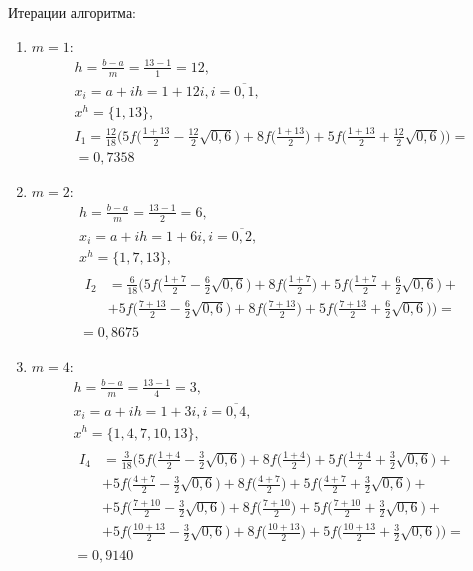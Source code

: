 \documentclass[a4paper, 12pt]{article}
\begin{document}
	Итерации алгоритма:
	\begin{enumerate}
		\item $m=1$:
		\begin{equation*}
			\begin{gathered}
				h=\frac{b-a}{m}=\frac{13-1}{1}=12,\\
				x_i=a+ih=1+12i, i=\overline{0,1},\\
				x^h=\{1,13\},\\
				I_1=\frac{12}{18}\bigg(5f\bigg(\frac{1+13}{2}-\frac{12}{2}\sqrt{0,6}\bigg)+8f\bigg(\frac{1+13}{2}\bigg)+5f\bigg(\frac{1+13}{2}+\frac{12}{2}\sqrt{0,6}\bigg)\bigg)=\\=0,7358
			\end{gathered}
		\end{equation*}
		\item $m=2$:
		\begin{equation*}
			\begin{gathered}
				h=\frac{b-a}{m}=\frac{13-1}{2}=6,\\
				x_i=a+ih=1+6i, i=\overline{0,2},\\
				x^h=\{1,7,13\},\\
				\begin{aligned}
					I_2&=\frac{6}{18}\bigg(5f\bigg(\frac{1+7}{2}-\frac{6}{2}\sqrt{0,6}\bigg)+8f\bigg(\frac{1+7}{2}\bigg)+5f\bigg(\frac{1+7}{2}+\frac{6}{2}\sqrt{0,6}\bigg)+\\&+5f\bigg(\frac{7+13}{2}-\frac{6}{2}\sqrt{0,6}\bigg)+8f\bigg(\frac{7+13}{2}\bigg)+5f\bigg(\frac{7+13}{2}+\frac{6}{2}\sqrt{0,6}\bigg)\bigg)=
				\end{aligned}\\
				=0,8675
			\end{gathered}
		\end{equation*}
		\item $m=4$:
		\begin{equation*}
			\begin{gathered}
				h=\frac{b-a}{m}=\frac{13-1}{4}=3,\\
				x_i=a+ih=1+3i, i=\overline{0,4},\\
				x^h=\{1,4,7,10,13\},\\
				\begin{aligned}
					I_4&=\frac{3}{18}\bigg(5f\bigg(\frac{1+4}{2}-\frac{3}{2}\sqrt{0,6}\bigg)+8f\bigg(\frac{1+4}{2}\bigg)+5f\bigg(\frac{1+4}{2}+\frac{3}{2}\sqrt{0,6}\bigg)+\\&+5f\bigg(\frac{4+7}{2}-\frac{3}{2}\sqrt{0,6}\bigg)+8f\bigg(\frac{4+7}{2}\bigg)+5f\bigg(\frac{4+7}{2}+\frac{3}{2}\sqrt{0,6}\bigg)+\\&+5f\bigg(\frac{7+10}{2}-\frac{3}{2}\sqrt{0,6}\bigg)+8f\bigg(\frac{7+10}{2}\bigg)+5f\bigg(\frac{7+10}{2}+\frac{3}{2}\sqrt{0,6}\bigg)+\\&+5f\bigg(\frac{10+13}{2}-\frac{3}{2}\sqrt{0,6}\bigg)+8f\bigg(\frac{10+13}{2}\bigg)+5f\bigg(\frac{10+13}{2}+\frac{3}{2}\sqrt{0,6}\bigg)\bigg)=
				\end{aligned}\\
				=0,9140
			\end{gathered}
	\end{equation*}
	\end{enumerate}
	
\end{document}
